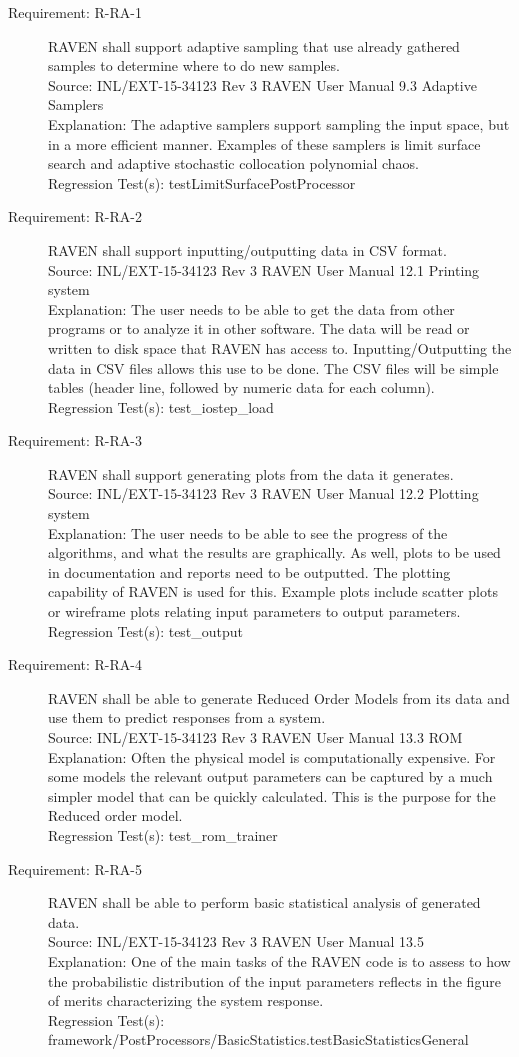 \documentclass{article}
\newcommand{\requirement}[5]{\item[Requirement: #1] #2 \\Source: #3\\Explanation: #4\\Regression Test(s): #5}
\begin{document}
\begin{description}

\requirement{R-RA-1}{RAVEN shall support adaptive sampling that use already gathered samples to determine where to do new samples.}
{INL/EXT-15-34123 Rev 3 RAVEN User Manual 9.3 Adaptive Samplers}
{The adaptive samplers support sampling the input space, but in a more efficient manner.  Examples of these samplers is limit surface search and adaptive stochastic collocation polynomial chaos.}
{testLimitSurfacePostProcessor}

\requirement{R-RA-2}{RAVEN shall support inputting/outputting data in CSV format.}
{INL/EXT-15-34123 Rev 3 RAVEN User Manual 12.1 Printing system}
{The user needs to be able to get the data from other programs or to analyze it in other software. The data will be read or written to disk space that RAVEN has access to. Inputting/Outputting the data in CSV files allows this use to be done.  The CSV files will be simple tables (header line, followed by numeric data for each column).}
{test\_iostep\_load}

\requirement{R-RA-3}{RAVEN shall support generating plots from the data it generates.}
{INL/EXT-15-34123 Rev 3 RAVEN User Manual 12.2 Plotting system}
{The user needs to be able to see the progress of the algorithms, and what the results are graphically.  As well, plots to be used in documentation and reports need to be outputted.  The plotting capability of RAVEN is used for this.  Example plots include scatter plots or wireframe plots relating input parameters to output parameters.}
{test\_output}

\requirement{R-RA-4}{RAVEN shall be able to generate Reduced Order Models from its data and use them to predict responses from a system.}
{INL/EXT-15-34123 Rev 3 RAVEN User Manual 13.3 ROM}
{Often the physical model is computationally expensive.  For some models the relevant output parameters can be captured by a much simpler model that can be quickly calculated.  This is the purpose for the Reduced order model.}
{test\_rom\_trainer}

\requirement{R-RA-5}{RAVEN shall be able to perform basic statistical analysis of generated data.}
{INL/EXT-15-34123 Rev 3 RAVEN User Manual 13.5}
{One of the main tasks of the RAVEN code is to assess to how the probabilistic distribution of the input parameters reflects in the figure of merits characterizing the system response.}
{framework/PostProcessors/BasicStatistics.testBasicStatisticsGeneral}


\end{description}
\end{document}
